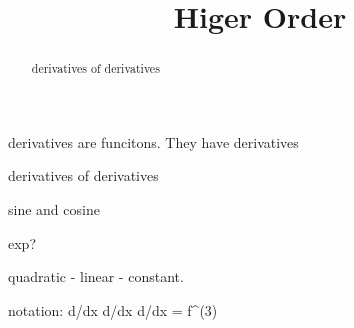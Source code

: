 \documentclass{ximera}
\title{Higer Order}
\begin{document}
\begin{abstract}
  derivatives of derivatives
\end{abstract}
\maketitle



derivatives are funcitons.  They have derivatives

derivatives of derivatives


sine and cosine

exp?


quadratic - linear - constant.




notation:   d/dx d/dx d/dx  = f^(3)
\end{document}
